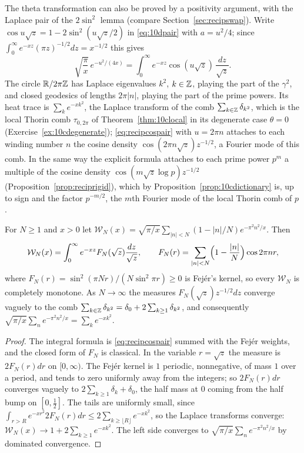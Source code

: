 The theta transformation can also be proved by a positivity argument, with the Laplace pair of the $2\sin^2$ lemma (compare Section~\ref{sec:recipswap}). Write $\cos u\sqrt z=1-2\sin^2(u\sqrt z/2)$ in \eqref{eq:10dpair} with $a=u^2/4$; since $\int_0^\infty e^{-xz}(\pi z)^{-1/2}dz=x^{-1/2}$ this gives
\begin{equation}\label{eq:recipcospair}
\sqrt{\frac\pi x}\,e^{-u^2/(4x)}=\int_0^\infty e^{-xz}\cos(u\sqrt z)\,\frac{dz}{\sqrt z} .
\end{equation}
The circle $\mathbb{R}/2\pi\mathbb{Z}$ has Laplace eigenvalues $k^2$, $k\in\mathbb{Z}$, playing the part of the $\gamma^2$, and closed geodesics of lengths $2\pi|n|$, playing the part of the prime powers. Its heat trace is $\sum_ke^{-xk^2}$, the Laplace transform of the comb $\sum_{k\in\mathbb{Z}}\delta_{k^2}$, which is the local Thorin comb $\tau_{0,2\pi}$ of Theorem~\ref{thm:10clocal} in its degenerate case $\theta=0$ (Exercise~\ref{ex:10cdegenerate}); \eqref{eq:recipcospair} with $u=2\pi n$ attaches to each winding number $n$ the cosine density $\cos(2\pi n\sqrt z)z^{-1/2}$, a Fourier mode of this comb. In the same way the explicit formula attaches to each prime power $p^m$ a multiple of the cosine density $\cos(m\sqrt z\log p)z^{-1/2}$ (Proposition~\ref{prop:reciprigid}), which by Proposition~\ref{prop:10cdictionary} is, up to sign and the factor $p^{-m/2}$, the $m$th Fourier mode of the local Thorin comb of $p$.

\begin{proposition}\label{prop:recipfejer}
For $N\ge1$ and $x>0$ let $\mathcal W_N(x)=\sqrt{\pi/x}\sum_{|n|<N}(1-|n|/N)e^{-\pi^2n^2/x}$. Then
\[
\mathcal W_N(x)=\int_0^\infty e^{-xz}F_N(\sqrt z)\frac{dz}{\sqrt z},\qquad F_N(r)=\sum_{|n|<N}\Bigl(1-\frac{|n|}N\Bigr)\cos2\pi nr ,
\]
where $F_N(r)=\sin^2(\pi Nr)/(N\sin^2\pi r)\ge0$ is Fej\'er's kernel, so every $\mathcal W_N$ is completely monotone. As $N\to\infty$ the measures $F_N(\sqrt z)z^{-1/2}dz$ converge vaguely to the comb $\sum_{k\in\mathbb{Z}}\delta_{k^2}=\delta_0+2\sum_{k\ge1}\delta_{k^2}$, and consequently $\sqrt{\pi/x}\sum_ne^{-\pi^2n^2/x}=\sum_ke^{-xk^2}$.
\end{proposition}

\begin{proof}
The integral formula is \eqref{eq:recipcospair} summed with the Fej\'er weights, and the closed form of $F_N$ is classical. In the variable $r=\sqrt z$ the measure is $2F_N(r)dr$ on $[0,\infty)$. The Fej\'er kernel is $1$ periodic, nonnegative, of mass $1$ over a period, and tends to zero uniformly away from the integers; so $2F_N(r)dr$ converges vaguely to $2\sum_{k\ge1}\delta_k+\delta_0$, the half mass at $0$ coming from the half bump on $[0,\frac12]$. The tails are uniformly small, since $\int_{r>R}e^{-xr^2}2F_N(r)dr\le2\sum_{k\ge\lfloor R\rfloor}e^{-xk^2}$, so the Laplace transforms converge: $\mathcal W_N(x)\to1+2\sum_{k\ge1}e^{-xk^2}$. The left side converges to $\sqrt{\pi/x}\sum_ne^{-\pi^2n^2/x}$ by dominated convergence.
\end{proof}

